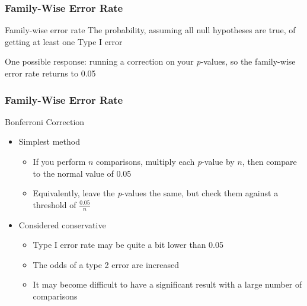 \documentclass[10pt, block=fill]{beamer}
\begin{document}
\begin{frame}
  \frametitle{Family-Wise Error Rate}

  \begin{block}{Family-wise error rate}
    The probability, assuming all null hypotheses are true, of getting at least one Type I error
  \end{block}
  
  One possible response: running a correction on your \textit{p}-values, so the family-wise error rate returns to 0.05
\end{frame}

\begin{frame}
  \frametitle{Family-Wise Error Rate}
    
  \begin{block}{Bonferroni Correction}
    \begin{itemize}
      \item Simplest method
      \begin{itemize}
        \item If you perform $n$ comparisons, multiply each \textit{p}-value by $n$, then compare to the normal value of 0.05
        \item Equivalently, leave the \textit{p}-values the same, but check them against a threshold of $\frac{0.05}{n}$
      \end{itemize}
      \item Considered conservative
      \begin{itemize}
        \item Type I error rate may be quite a bit lower than 0.05
        \item The odds of a type 2 error are increased
        \item It may become difficult to have a significant result with a large number of comparisons
      \end{itemize}
    \end{itemize}
  \end{block}
  
\end{frame}
\end{document}
